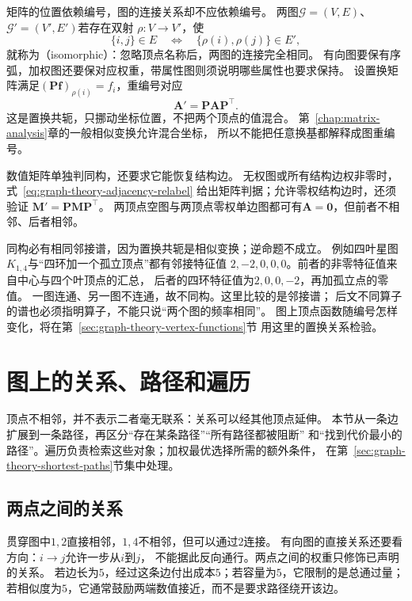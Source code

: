 矩阵的位置依赖编号，图的连接关系却不应依赖编号。
两图\(\mathcal G=(V,E)\)、\(\mathcal G'=(V',E')\)若存在双射
\(\rho:V\to V'\)，使
\[
  \{i,j\}\in E
  \quad\Longleftrightarrow\quad
  \{\rho(i),\rho(j)\}\in E',
\]
就称为（isomorphic）：忽略顶点名称后，两图的连接完全相同。
有向图要保有序弧，加权图还要保对应权重，带属性图则须说明哪些属性也要求保持。
设置换矩阵满足\((\bm P\bm f)_{\rho(i)}=f_i\)，重编号对应
\begin{equation}
  \bm A'=\bm P\bm A\bm P^\top.
  \label{eq:graph-theory-adjacency-relabel}
\end{equation}
这是置换共轭，只挪动坐标位置，不把两个顶点的值混合。
第~\ref{chap:matrix-analysis}章的一般相似变换允许混合坐标，
所以不能把任意换基都解释成图重编号。

数值矩阵单独判同构，还要求它能恢复结构边。
无权图或所有结构边权非零时，式~\eqref{eq:graph-theory-adjacency-relabel}
给出矩阵判据；允许零权结构边时，还须验证
\(\bm M'=\bm P\bm M\bm P^\top\)。
两顶点空图与两顶点零权单边图都可有\(\bm A=\bm0\)，但前者不相邻、后者相邻。

同构必有相同邻接谱，因为置换共轭是相似变换；逆命题不成立。
例如四叶星图\(K_{1,4}\)与“四环加一个孤立顶点”都有邻接特征值
\(2,-2,0,0,0\)。前者的非零特征值来自中心与四个叶顶点的汇总，
后者的四环特征值为\(2,0,0,-2\)，再加孤立点的零值。
一图连通、另一图不连通，故不同构。这里比较的是邻接谱；
后文不同算子的谱也必须指明算子，不能只说“两个图的频率相同”。
图上顶点函数随编号怎样变化，将在第~\ref{sec:graph-theory-vertex-functions}节
用这里的置换关系检验。

\section{图上的关系、路径和遍历}
\label{sec:graph-theory-paths-traversal}

顶点不相邻，并不表示二者毫无联系：关系可以经其他顶点延伸。
本节从一条边扩展到一条路径，再区分“存在某条路径”“所有路径都被阻断”
和“找到代价最小的路径”。遍历负责检索这些对象；加权最优选择所需的额外条件，
在第~\ref{sec:graph-theory-shortest-paths}节集中处理。

\subsection{两点之间的关系}

贯穿图中\(1,2\)直接相邻，\(1,4\)不相邻，但可以通过\(2\)连接。
有向图的直接关系还要看方向：\(i\to j\)允许一步从\(i\)到\(j\)，
不能据此反向通行。两点之间的权重只修饰已声明的关系。
若边长为\(5\)，经过这条边付出成本\(5\)；若容量为\(5\)，它限制的是总通过量；
若相似度为\(5\)，它通常鼓励两端数值接近，而不是要求路径绕开该边。

